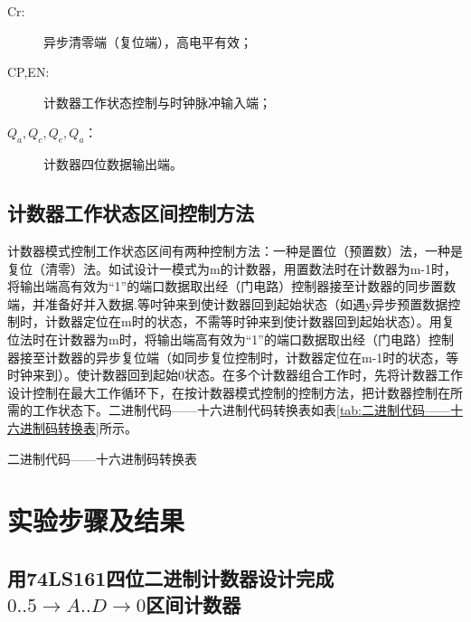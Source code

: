 \documentclass{ctexrep}
\begin{document}
\begin{description}
	\item[Cr:] 异步清零端（复位端），高电平有效；
	\item[CP,EN:] 计数器工作状态控制与时钟脉冲输入端；
	\item[$ Q_a,Q_c,Q_e,Q_a $：] 计数器四位数据输出端。
\end{description}

\subsection{计数器工作状态区间控制方法}%
\label{sub:计数器工作状态区间控制方法}

计数器模式控制工作状态区间有两种控制方法：一种是置位（预置数）法，一种是复位（清零）法。如试设计一模式为m的计数器，用置数法时在计数器为m-1时，将输出端高有效为“1”的端口数据取出经（门电路）控制器接至计数器的同步置数端，并准备好并入数据.等吋钟来到使计数器回到起始状态（如遇y异步预置数据控制时，计数器定位在m时的状态，不需等时钟来到使计数器回到起始状态）。用复位法时在计数器为m时，将输出端高有效为“1”的端口数据取出经（门电路）控制器接至计数器的异步复位端（如同步复位控制时，计数器定位在m-1时的状态，等时钟来到）。使计数器回到起始0状态。在多个计数器组合工作时，先将计数器工作设计控制在最大工作循环下，在按计数器模式控制的控制方法，把计数器控制在所需的工作状态下。二进制代码——十六进制代码转换表如表\ref{tab:二进制代码——十六进制码转换表}所示。

\begin{table}[htbp]
	\centering
	\caption{二进制代码——十六进制码转换表}
	\label{tab:二进制代码——十六进制码转换表}
\end{table}

\newpage
\section{实验步骤及结果}%
\label{sec:实验步骤及结果\arabic{chapter}}

\subsection{用74LS161四位二进制计数器设计完成$ 0..5\rightarrow A..D\rightarrow 0 $区间计数器}%
\label{sub:用74LS161四位二进制计数器设计完成区间计数器}
\end{document}
